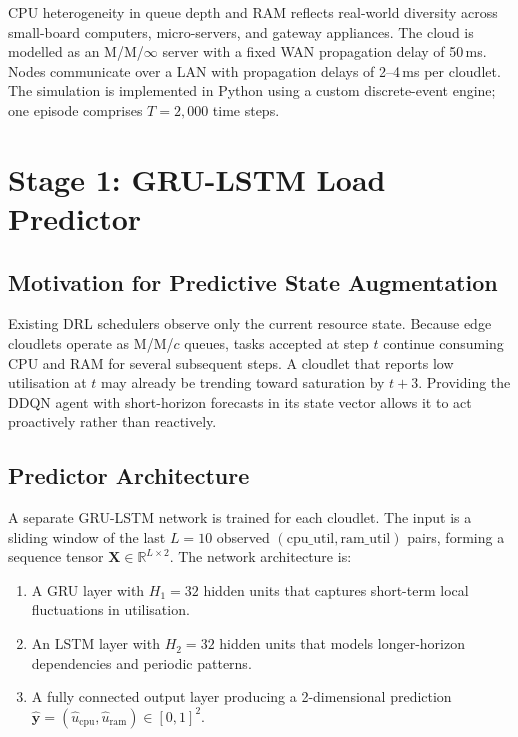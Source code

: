 CPU heterogeneity in queue depth and RAM reflects real-world
diversity across small-board computers, micro-servers, and
gateway appliances. The cloud is modelled as an M/M/$\infty$
server with a fixed WAN propagation delay of 50\,ms. Nodes
communicate over a LAN with propagation delays of 2--4\,ms per
cloudlet. The simulation is implemented in Python using a custom
discrete-event engine; one episode comprises $T = 2{,}000$ time
steps.

\section{Stage 1: GRU-LSTM Load Predictor}
\label{sec:lstm}

\subsection{Motivation for Predictive State Augmentation}

Existing DRL schedulers observe only the current resource state.
Because edge cloudlets operate as M/M/$c$ queues, tasks accepted
at step $t$ continue consuming CPU and RAM for several subsequent
steps. A cloudlet that reports low utilisation at $t$ may already
be trending toward saturation by $t{+}3$. Providing the DDQN
agent with short-horizon forecasts in its state vector allows it
to act proactively rather than reactively.

\subsection{Predictor Architecture}

A separate GRU-LSTM network is trained for each cloudlet. The
input is a sliding window of the last $L = 10$ observed
$(\text{cpu\_util}, \text{ram\_util})$ pairs, forming a sequence
tensor $\mathbf{X} \in \mathbb{R}^{L \times 2}$. The network
architecture is:

\begin{enumerate}
  \item A GRU layer with $H_1 = 32$ hidden units that captures
  short-term local fluctuations in utilisation.
  \item An LSTM layer with $H_2 = 32$ hidden units that models
  longer-horizon dependencies and periodic patterns.
  \item A fully connected output layer producing a 2-dimensional
  prediction $\hat{\mathbf{y}} = (\hat{u}_{\text{cpu}},
  \hat{u}_{\text{ram}}) \in [0,1]^2$.
\end{enumerate}


